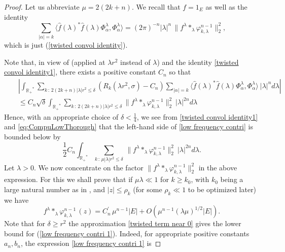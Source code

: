 \documentclass[10pt,a4paper]{amsart}
\newcommand{\R}{\ensuremath{\mathbb{R_+}}}
\begin{document}
\begin{proof}
Let us abbreviate  $\mu = 2(2k +n)$. We recall that $f= 1_{E}$ as well as the identity 
\begin{equation}\label{twisted convol identity1}
  \sum_{|\alpha|=k} \langle \widehat{f}(\lambda)^{*} \widehat{f}(\lambda) \Phi_{\alpha}^{\lambda} , \Phi_{\alpha}^{\lambda}  \rangle = (2 \pi)^{-n} |\lambda|^n \,   \| f^{\lambda} \ast_{\lambda} \varphi_{k, \lambda}^{n-1} \|_{2}^2,
\end{equation}
which is just (\ref{twisted convol identity}).

Note that,  in view of  (applied at $\lambda r^2$ instead of $\lambda$) and the identity \eqref{twisted convol identity1}, there exists a positive constant $C_{n}$ so that
\begin{eqnarray}
\nonumber && \left|\int_{\R^{*}} \sum_{k \, : \, 2(2k +n) |\lambda | r^2 \leq \delta} \left(R_{k}(\lambda r^{2},\sigma) -C_n\right)\sum_{|\alpha|=k} \langle \hat{f}(\lambda)^{*} \hat{f}(\lambda) \Phi_{\alpha}^{\lambda},\Phi_{\alpha}^{\lambda} \rangle \ |\lambda|^n d\lambda\right|\\
&&\leq C_{n} \sqrt{\delta} \int_{\R^{*}} \sum_{k \, : \, 2(2k +n) |\lambda | r^2 \leq \delta}\| f^{\lambda} \ast_{\lambda} \varphi_{k, \lambda}^{n-1} \|_{2}^2 \ |\lambda|^{2n} d\lambda \label{eq:CompuLowThorough}
\end{eqnarray}
Hence, with an appropriate choice of $\delta<\frac14$, we see from  \eqref{twisted convol identity1} and \eqref{eq:CompuLowThorough} that the left-hand  side of \eqref{low frequency contri} is  bounded below by
    \begin{equation}\label{low frequency contri 1}
    \frac12C_n\int_{\R^{*}} \sum_{k \, : \, \mu |\lambda | r^2 \leq \delta } \,   \| f^{\lambda} \ast_{\lambda} \varphi_{k, \lambda}^{n-1} \|_{2}^2 \ |\lambda|^{2n} d\lambda.
\end{equation}
Let $\lambda>0$. We now concentrate on the factor $\| f^{\lambda} \ast_{\lambda} \varphi_{k, \lambda}^{n-1} \|_{2}^2$ in the above expression. For this we shall prove that if  $\mu \lambda \ll 1$ for $k \geq k_{0}$, with $k_{0}$ being a large natural number as in , and $| z| \leq \rho_{k}$ (for some $\rho_{k} \ll 1$ to be optimized later) we have
\begin{equation}\label{twisted term near 0}
    f^{\lambda} \ast_{\lambda} \varphi_{k, \lambda}^{n-1} \, (z) = C_{n}^{\prime} \, \mu^{n-1} |E| +   O (  \mu^{n-1} (\lambda \mu)^{1/2} |E|).
\end{equation}
Note that for $\delta \geq r^2$ the approximation \eqref{twisted term near 0} gives the lower bound for (\ref{low frequency contri 1}). Indeed, for appropriate positive constants $a_n,b_n$,  the expression \eqref{low frequency contri 1} is 



\end{proof}
\end{document}
